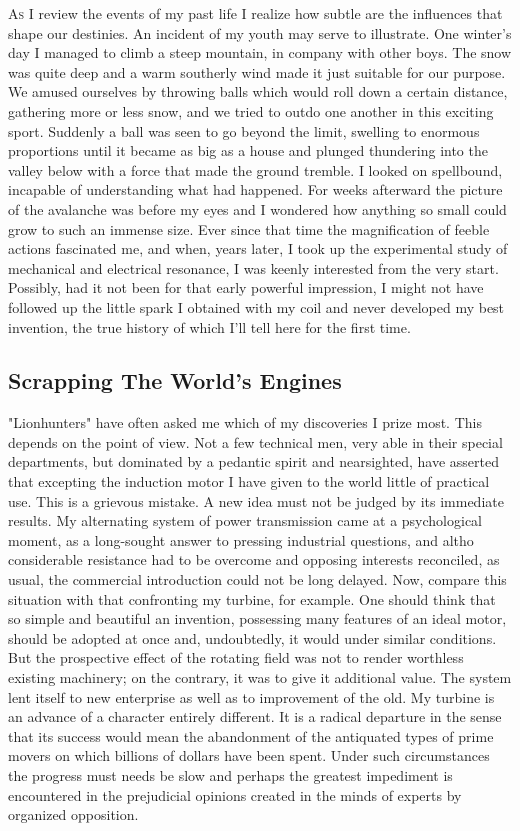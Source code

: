 \documentclass[a4paper,12pt,english,twoside,openright]{memoir}
\begin{document}
\lettrine[lines=3]{A}{s} I review the events of my past life I realize how subtle are the influences that shape our 
destinies.  An incident of my youth may serve to illustrate.  One winter's day I managed to climb a 
steep mountain, in company with other boys.  The snow was quite deep and a warm southerly 
wind made it just suitable for our purpose.  We amused ourselves by throwing balls which would 
roll down a certain distance, gathering more or less snow, and we tried to outdo one another in 
this exciting sport.  Suddenly a ball was seen to go beyond the limit, swelling to enormous 
proportions until it became as big as a house and plunged thundering into the valley below with a 
force that made the ground tremble.  I looked on spellbound, incapable of understanding what 
had happened.  For weeks afterward the picture of the avalanche was before my eyes and I 
wondered how anything so small could grow to such an immense size.  Ever since that time the 
magnification of feeble actions fascinated me, and when, years later, I took up the experimental 
study of mechanical and electrical resonance, I was keenly interested from the very start.  
Possibly, had it not been for that early powerful impression, I might not have followed up the little 
spark I obtained with my coil and never developed my best invention, the true history of which I'll 
tell here for the first time.  

\subsection{Scrapping The World's Engines}
"Lionhunters" have often asked me which of my discoveries I prize most.  This depends on the 
point of view.  Not a few technical men, very able in their special departments, but dominated by 
a pedantic spirit and nearsighted, have asserted that excepting the induction motor I have given 
to the world little of practical use.  This is a grievous mistake.  A new idea must not be judged by 
its immediate results.  My alternating system of power transmission came at a psychological 
moment, as a long-sought answer to pressing industrial questions, and altho considerable 
resistance had to be overcome and opposing interests reconciled, as usual, the commercial 
introduction could not be long delayed.  Now, compare this situation with that confronting my 
turbine, for example.  One should think that so simple and beautiful an invention, possessing 
many features of an ideal motor, should be adopted at once and, undoubtedly, it would under 
similar conditions.  But the prospective effect of the rotating field was not to render worthless 
existing machinery; on the contrary, it was to give it additional value.  The system lent itself to 
new enterprise as well as to improvement of the old.  My turbine is an advance of a character 
entirely different.  It is a radical departure in the sense that its success would mean the 
abandonment of the antiquated types of prime movers on which billions of dollars have been 
spent.  Under such circumstances the progress must needs be slow and perhaps the greatest 
impediment is encountered in the prejudicial opinions created in the minds of experts by 
organized opposition.  
\end{document}
